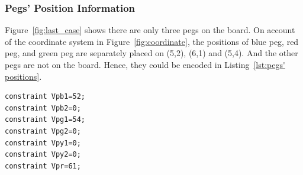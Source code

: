 \subsubsection{Pegs' Position Information}
Figure~\ref{fig:last_case} shows there are only three pegs on the board. On account of the coordinate system in Figure~\ref{fig:coordinate}, the positions of blue peg, red peg, and green peg are separately placed on (5,2), (6,1) and (5,4). And the other pegs are not on the board. Hence, they could be encoded in Listing~\ref{lst:pegs' positions}.
\begin{lstlisting}[language=minizinc,numbers=none,caption={Encoding for pegs' positions},label={lst:pegs' positions}]
constraint Vpb1=52;
constraint Vpb2=0;  
constraint Vpg1=54;
constraint Vpg2=0;
constraint Vpy1=0;
constraint Vpy2=0;
constraint Vpr=61;
\end{lstlisting}
\bigskip
\smallbreak
